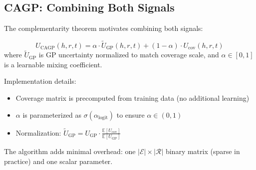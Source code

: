 \subsection{CAGP: Combining Both Signals}

The complementarity theorem motivates combining both signals:

\begin{definition}
\begin{equation}
    U_{\text{CAGP}}(h, r, t) = \alpha \cdot \tilde{U}_{\text{GP}}(h, r, t) + (1-\alpha) \cdot U_{\text{cov}}(h, r, t)
\end{equation}
where $\tilde{U}_{\text{GP}}$ is GP uncertainty normalized to match coverage scale, and $\alpha \in [0,1]$ is a learnable mixing coefficient.
\end{definition}

Implementation details:
\begin{itemize}
    \item Coverage matrix is precomputed from training data (no additional learning)
    \item $\alpha$ is parameterized as $\sigma(\alpha_{\text{logit}})$ to ensure $\alpha \in (0,1)$
    \item Normalization: $\tilde{U}_{\text{GP}} = U_{\text{GP}} \cdot \frac{\mathbb{E}[U_{\text{cov}}]}{\mathbb{E}[U_{\text{GP}}]}$
\end{itemize}

The algorithm adds minimal overhead: one $|\mathcal{E}| \times |\mathcal{R}|$ binary matrix (sparse in practice) and one scalar parameter.
